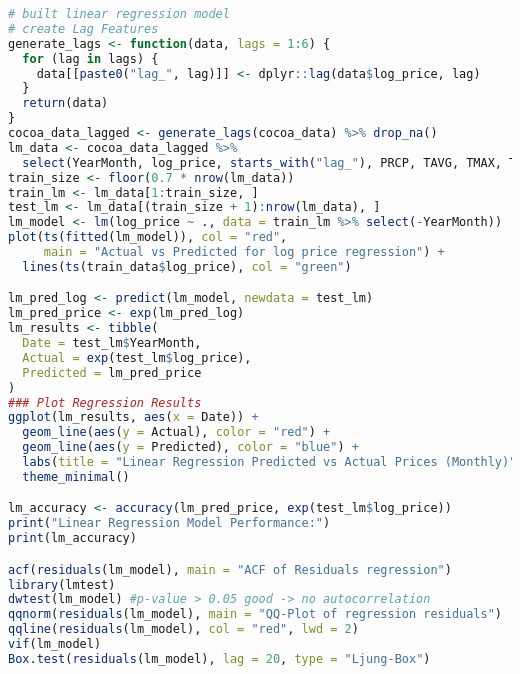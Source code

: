 \documentclass[10pt]{article}
\begin{document}
\begin{lstlisting}[language=R, caption=Linear Regression]
# built linear regression model
# create Lag Features
generate_lags <- function(data, lags = 1:6) {
  for (lag in lags) {
    data[[paste0("lag_", lag)]] <- dplyr::lag(data$log_price, lag)
  }
  return(data)
}
cocoa_data_lagged <- generate_lags(cocoa_data) %>% drop_na()
lm_data <- cocoa_data_lagged %>%
  select(YearMonth, log_price, starts_with("lag_"), PRCP, TAVG, TMAX, TMIN)
train_size <- floor(0.7 * nrow(lm_data))
train_lm <- lm_data[1:train_size, ]
test_lm <- lm_data[(train_size + 1):nrow(lm_data), ]
lm_model <- lm(log_price ~ ., data = train_lm %>% select(-YearMonth))
plot(ts(fitted(lm_model)), col = "red", 
     main = "Actual vs Predicted for log price regression") + 
  lines(ts(train_data$log_price), col = "green")

lm_pred_log <- predict(lm_model, newdata = test_lm)
lm_pred_price <- exp(lm_pred_log)
lm_results <- tibble(
  Date = test_lm$YearMonth,
  Actual = exp(test_lm$log_price),
  Predicted = lm_pred_price
)
### Plot Regression Results
ggplot(lm_results, aes(x = Date)) +
  geom_line(aes(y = Actual), color = "red") +
  geom_line(aes(y = Predicted), color = "blue") +
  labs(title = "Linear Regression Predicted vs Actual Prices (Monthly)", y = "Price", x = "Date") +
  theme_minimal()

lm_accuracy <- accuracy(lm_pred_price, exp(test_lm$log_price))
print("Linear Regression Model Performance:")
print(lm_accuracy)

acf(residuals(lm_model), main = "ACF of Residuals regression")
library(lmtest)
dwtest(lm_model) #p-value > 0.05 good -> no autocorrelation
qqnorm(residuals(lm_model), main = "QQ-Plot of regression residuals")
qqline(residuals(lm_model), col = "red", lwd = 2)
vif(lm_model)
Box.test(residuals(lm_model), lag = 20, type = "Ljung-Box")
\end{lstlisting}
\end{document}
